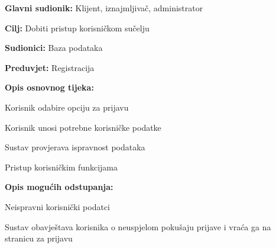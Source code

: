 						\noindent {}
					\begin{packed_item}
	
						\item \textbf{Glavni sudionik: }Klijent, iznajmljivač, administrator
						\item  \textbf{Cilj: }Dobiti pristup korisničkom sučelju
						\item  \textbf{Sudionici: }Baza podataka
						\item  \textbf{Preduvjet: }Registracija
						\item  \textbf{Opis osnovnog tijeka:}
						
						\item[] \begin{packed_enum}
	
							\item Korisnik odabire opciju za prijavu
							\item Korisnik unosi potrebne korisničke podatke
							\item Sustav provjerava ispravnost podataka
							\item Pristup korisničkim funkcijama

						\end{packed_enum}
						
						\item  \textbf{Opis mogućih odstupanja:}
						
						\item[] \begin{packed_item}
	
							\item[2.a] Neispravni korisnički podatci
							\item[] \begin{packed_enum}
								
								\item Sustav obavještava korisnika o neuspjelom pokušaju prijave i vraća ga na stranicu za prijavu
								
							\end{packed_enum}
							
						\end{packed_item}						
					\end{packed_item}			
					



